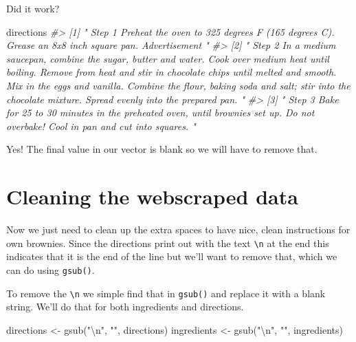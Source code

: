 \documentclass[
]{krantz}
\makeatletter
\newenvironment{Shaded}{\begin{snugshade}}{\end{snugshade}}
\newcommand{\CommentTok}[1]{\textcolor[rgb]{0.37,0.37,0.37}{\textit{#1}}}
\newcommand{\FunctionTok}[1]{\textcolor[rgb]{0,0,0}{#1}}
\newcommand{\NormalTok}[1]{#1}
\newcommand{\OtherTok}[1]{\textcolor[rgb]{0.37,0.37,0.37}{#1}}
\newcommand{\SpecialCharTok}[1]{\textcolor[rgb]{0,0,0}{#1}}
\newcommand{\StringTok}[1]{\textcolor[rgb]{0.5,0.5,0.5}{#1}}
\newenvironment{kframe}{%
\medskip{}
\setlength{\fboxsep}{.8em}
 \def\at@end@of@kframe{}%
 \ifinner\ifhmode%
  \def\at@end@of@kframe{\end{minipage}}%
  \begin{minipage}{\columnwidth}%
 \fi\fi%
 \def\FrameCommand##1{\hskip\@totalleftmargin \hskip-\fboxsep
 \colorbox{shadecolor}{##1}\hskip-\fboxsep
     \hskip-\linewidth \hskip-\@totalleftmargin \hskip\columnwidth}%
 \MakeFramed {\advance\hsize-\width
   \@totalleftmargin\z@ \linewidth\hsize
   \@setminipage}}%
 {\par\unskip\endMakeFramed%
 \at@end@of@kframe}
\renewenvironment{Shaded}{\begin{kframe}}{\end{kframe}}
\makeatother
\begin{document}
Did it work?

\begin{Shaded}
\begin{Highlighting}[]
\NormalTok{directions}
\CommentTok{\#\textgreater{} [1] "   Step 1   Preheat the oven to 325 degrees F (165 degrees C). Grease an 8x8 inch square pan.    Advertisement "                                                                                                                                                                                                                 }
\CommentTok{\#\textgreater{} [2] "   Step 2   In a medium saucepan, combine the sugar, butter and water. Cook over medium heat until boiling. Remove from heat and stir in chocolate chips until melted and smooth. Mix in the eggs and vanilla. Combine the flour, baking soda and salt; stir into the chocolate mixture. Spread evenly into the prepared pan.   "}
\CommentTok{\#\textgreater{} [3] "   Step 3   Bake for 25 to 30 minutes in the preheated oven, until brownies set up. Do not overbake! Cool in pan and cut into squares.   "}
\end{Highlighting}
\end{Shaded}

Yes! The final value in our vector is blank so we will have to remove that.

\hypertarget{cleaning-the-webscraped-data}{%
\section{Cleaning the webscraped data}\label{cleaning-the-webscraped-data}}

Now we just need to clean up the extra spaces to have nice, clean instructions for own brownies. Since the directions print out with the text \texttt{\textbackslash{}n} at the end this indicates that it is the end of the line but we'll want to remove that, which we can do using \texttt{gsub()}.

To remove the \texttt{\textbackslash{}n} we simple find that in \texttt{gsub()} and replace it with a blank string. We'll do that for both ingredients and directions.

\begin{Shaded}
\begin{Highlighting}[]
\NormalTok{directions }\OtherTok{\textless{}{-}} \FunctionTok{gsub}\NormalTok{(}\StringTok{"}\SpecialCharTok{\textbackslash{}n}\StringTok{"}\NormalTok{, }\StringTok{""}\NormalTok{, directions)}
\NormalTok{ingredients }\OtherTok{\textless{}{-}} \FunctionTok{gsub}\NormalTok{(}\StringTok{"}\SpecialCharTok{\textbackslash{}n}\StringTok{"}\NormalTok{, }\StringTok{""}\NormalTok{, ingredients)}
\end{Highlighting}
\end{Shaded}
\end{document}
